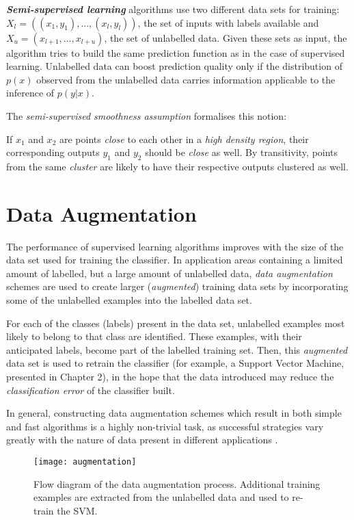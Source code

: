 \documentclass[12pt,twoside,notitlepage,amsart]{report} %
\begin{document}
	\textbf{\emph{Semi-supervised learning}} algorithms use two different data sets for training: $X_l = ( (x_1, y_1) ,...,(x_l, y_l) )$, the set of inputs with labels available and $X_u = (x_{l+1},...,x_{l+u})$, the set of unlabelled data. Given these sets as input, the algorithm tries to build the same prediction function as in the case of supervised learning. Unlabelled data can boost prediction quality only if the distribution of $p(x)$ observed from the unlabelled data carries information applicable to the inference of $p(y|x)$.
	
	The \emph{semi-supervised smoothness assumption} formalises this notion: 
	
	If $x_1$ and $x_2$ are points \emph{close} to each other in a \emph{high density region}, their corresponding outputs $y_1$ and $y_2$ should be \emph{close} as well. By transitivity, points from the same \emph{cluster} are likely to have their respective outputs clustered as well. 
	
	\section{Data Augmentation}
	
	The performance of supervised learning algorithms improves with the size of the data set used for training the classifier. In application areas containing a limited amount of labelled, but a large amount of unlabelled data, \emph{data augmentation} schemes are used to create larger (\emph{augmented}) training data sets by incorporating some of the unlabelled examples into the labelled data set. 
	
	For each of the classes (labels) present in the data set, unlabelled examples most likely to belong to that class are identified. These examples, with their anticipated labels, become part of the labelled training set. Then, this \emph{augmented} data set is used to retrain the classifier (for example, a Support Vector Machine, presented in Chapter 2), in the hope that the data introduced may reduce the \emph{classification error} of the classifier built. 
	
	In general, constructing data augmentation schemes which result in both simple and fast algorithms is a highly non-trivial task, as successful strategies vary greatly with the nature of data present in different applications \cite{Nigam98}.
	
	\begin{figure}
	\texttt{[image: augmentation]}
	
	\caption{Flow diagram of the data augmentation process. Additional training examples are extracted from the unlabelled data and used to re-train the SVM. }%
	\label{}%
	\end{figure}
	
\end{document}
